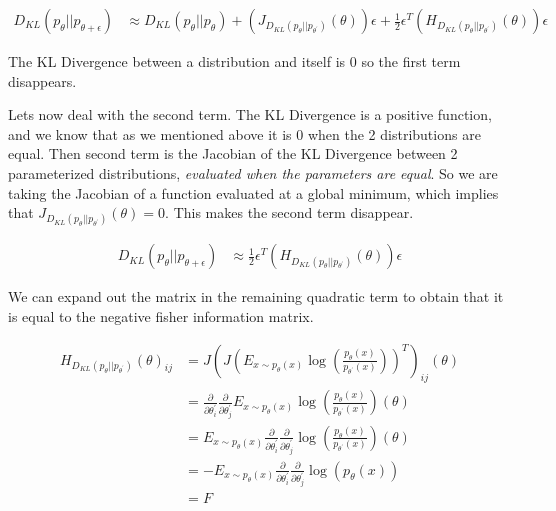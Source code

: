 \documentclass[12pt, a4paper]{report}
\theoremstyle{definition}
\theoremstyle{definition}
\theoremstyle{definition}
\begin{document}
\begin{align}
    D_{KL} \left(p_\theta || p_{\theta + \epsilon} \right) &\approx  D_{KL} \left(p_\theta || p_{\theta} \right) + \left(J_{D_{KL} \left(p_\theta || p_{\theta^\prime} \right)}\left( \theta \right) \right) \epsilon + \frac{1}{2} \epsilon^T \left( H_{D_{KL} \left(p_\theta || p_{\theta^\prime} \right)}\left( \theta \right) \right) \epsilon
\end{align}

The KL Divergence between a distribution and itself is $0$ so the first term disappears.


Lets now deal with the second term. The KL Divergence is a positive function, and we know that as we mentioned above it is $0$ when the 2 distributions are equal. Then second term is the Jacobian of the KL Divergence between 2 parameterized distributions, \textit{evaluated when the parameters are equal}. So we are taking the Jacobian of a function evaluated at a global minimum, which implies that $J_{D_{KL} \left(p_\theta || p_{\theta^\prime} \right)}\left( \theta \right)  = 0$. This makes the second term disappear.


\begin{align}
    D_{KL} \left(p_\theta || p_{\theta + \epsilon} \right) &\approx  \frac{1}{2} \epsilon^T \left( H_{D_{KL} \left(p_\theta || p_{\theta^\prime} \right)}\left( \theta \right) \right) \epsilon
\end{align}


We can expand out the matrix in the remaining quadratic term to obtain that it is equal to the negative fisher information matrix.

\begin{align}
    H_{D_{KL} \left(p_\theta || p_{\theta^\prime} \right)}\left( \theta \right)_{ij} &= J \left( J \left( E_{x \sim p_\theta(x)}  \log \left( \frac{p_\theta(x)}{p_{\theta^\prime}(x)}\right)\right)^T \right)_{ij} \left( \theta \right) \\
    &= \frac{\partial}{\partial \theta^\prime_i} \frac{\partial}{\partial \theta^\prime_j} E_{x \sim p_\theta(x)}  \log \left( \frac{p_\theta(x)}{p_{\theta^\prime}(x)}\right) \left( \theta \right) \\
    &= E_{x \sim p_\theta(x)} \frac{\partial}{\partial \theta^\prime_i} \frac{\partial}{\partial \theta^\prime_j}  \log \left( \frac{p_\theta(x)}{p_{\theta^\prime}(x)}\right) \left( \theta \right) \\
    &= - E_{x \sim p_\theta(x)} \frac{\partial}{\partial \theta^\prime_i} \frac{\partial}{\partial \theta^\prime_j}  \log \left( p_{\theta}(x) \right)  \\
    &= F \\
\end{align}
\end{document}
